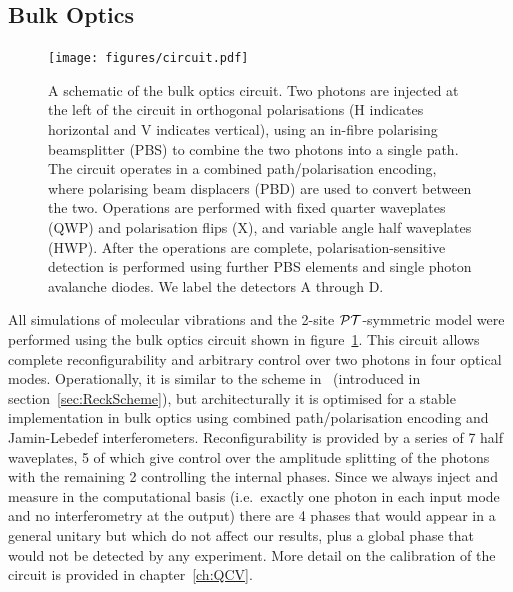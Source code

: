 \subsection{Bulk Optics}
\label{sec:BulkReck}
\begin{figure}[t]
  \centering
  \texttt{[image: figures/circuit.pdf]}
  \caption[A schematic of the bulk optics circuit used for simulations.]
  {A schematic of the bulk optics circuit. Two photons are injected at
  the left of the circuit in orthogonal polarisations (H indicates
  horizontal and V indicates vertical), using an in-fibre polarising
  beamsplitter (PBS) to combine the two photons into a single path. The circuit
  operates in a combined path/polarisation encoding, where polarising beam
  displacers (PBD) are used to convert between the two. Operations are performed
  with fixed quarter waveplates (QWP) and polarisation flips (X), and variable
  angle half waveplates (HWP). After the operations are complete,
  polarisation-sensitive detection is performed using further PBS elements and
  single photon avalanche diodes. We label the detectors A through D.}
  \label{fig:circuit}
\end{figure}
All simulations of molecular vibrations and the 2-site \(\mathcal{PT}\)-symmetric model
were performed using the bulk optics circuit shown in
figure~\ref{fig:circuit}. This circuit allows complete reconfigurability and
arbitrary control over two photons in four optical modes. Operationally, it is
similar to the scheme in~\cite{reck} (introduced in
section~\ref{sec:ReckScheme}), but architecturally it is optimised for a stable
implementation in bulk optics using combined path/polarisation encoding and 
Jamin-Lebedef interferometers. Reconfigurability is provided by a series of 7
half waveplates, 5 of which give control over the amplitude splitting of the
photons with the remaining 2 controlling the internal phases. Since we always
inject and measure in the computational basis (i.e.\ exactly one photon in each
input mode and no interferometry at the output) there are 4 phases that would
appear in a general unitary but which do not affect our results, plus a global
phase that would not be detected by any experiment. More detail on the
calibration of the circuit is provided in chapter~\ref{ch:QCV}.

